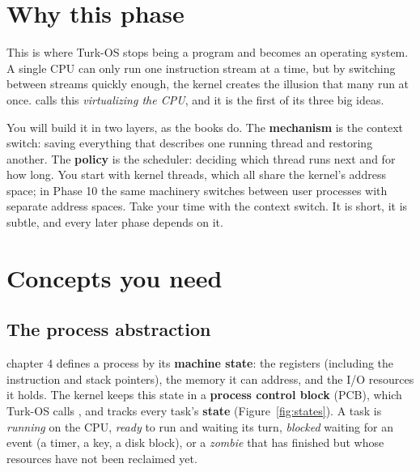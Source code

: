 \documentclass[11pt,a4paper]{article}
\begin{document}


\section{Why this phase}

This is where Turk-OS stops being a program and becomes an operating system. A single CPU can only run one
instruction stream at a time, but by switching between streams quickly enough, the kernel creates the illusion that
many run at once. \OSTEP calls this \emph{virtualizing the CPU}, and it is the first of its three big ideas.

You will build it in two layers, as the books do. The \textbf{mechanism} is the context switch: saving everything
that describes one running thread and restoring another. The \textbf{policy} is the scheduler: deciding which thread
runs next and for how long. You start with kernel threads, which all share the kernel's address space; in Phase 10
the same machinery switches between user processes with separate address spaces. Take your time with the context
switch. It is short, it is subtle, and every later phase depends on it.

\section{Concepts you need}

\subsection{The process abstraction}

\OSTEP chapter 4 defines a process by its \textbf{machine state}: the registers (including the instruction and stack
pointers), the memory it can address, and the I/O resources it holds. The kernel keeps this state in a
\textbf{process control block} (PCB), which Turk-OS calls , and tracks every task's
\textbf{state} (Figure~\ref{fig:states}). A task is \emph{running} on the CPU, \emph{ready} to run and waiting its turn,
\emph{blocked} waiting for an event (a timer, a key, a disk block), or a \emph{zombie} that has finished but whose
resources have not been reclaimed yet.
\end{document}
